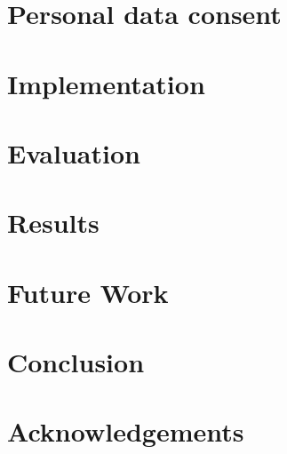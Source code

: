 \documentclass{llncs}
\begin{document}
\section{Personal data consent}
\label{sec:research_question}


\section{Implementation}
\label{sec:implementation}


\section{Evaluation}
\label{sec:evaluation}


\section{Results}
\label{sec:results}


\section{Future Work}

\section{Conclusion}
\label{sec:conclusion}


\section{Acknowledgements}
\label{sec:acknoledgements}




\end{document}
